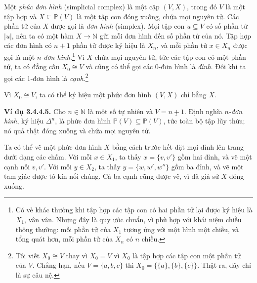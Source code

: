 Một \emph{phức đơn hình} (simplicial complex) là một cặp $(V,X)$, trong đó $V$ là một tập hợp và $X\subseteq\mathbb P(V)$ là một tập con đóng xuống, chứa mọi nguyên tử. Các phần tử của $X$ được gọi là \emph{đơn hình} (simplex). Mọi tập con $u\subseteq V$ có số phần tử $|u|$, nên ta có một hàm $X\to\mathbb N$ gửi mỗi đơn hình đến số phần tử của nó. Tập hợp các đơn hình có $n+1$ phần tử được ký hiệu là $X_n$, và mỗi phần tử $x\in X_n$ được gọi là một \emph{$n$-đơn hình}.\footnote{Có vẻ khác thường khi tập hợp các tập con có hai phần tử lại được ký hiệu là $X_1$, vân vân. Nhưng đây là quy ước chuẩn, vì phù hợp với khái niệm chiều thông thường: mỗi phần tử của $X_1$ tương ứng với một hình một chiều, và tổng quát hơn, mỗi phần tử của $X_n$ có $n$ chiều.} Vì $X$ chứa mọi nguyên tử, tức các tập con có một phần tử, ta có đẳng cấu $X_0\cong V$ và cũng có thể gọi các 0-đơn hình là \emph{đỉnh}. Đôi khi ta gọi các 1-đơn hình là \emph{cạnh}.\footnote{Tôi viết $X_0\cong V$ thay vì $X_0=V$ vì $X_0$ là tập hợp các tập con một phần tử của $V$. Chẳng hạn, nếu $V=\{a,b,c\}$ thì $X_0=\{\{a\},\{b\},\{c\}\}$. Thật ra, đây chỉ là sự câu nệ.}

Vì $X_0\cong V$, ta có thể ký hiệu một phức đơn hình $(V,X)$ chỉ bằng $X$.

\noindent\textbf{Ví dụ 3.4.4.5.} Cho $n\in\mathbb N$ là một số tự nhiên và $V=\underline{n+1}$. Định nghĩa \emph{$n$-đơn hình}, ký hiệu $\Delta^n$, là phức đơn hình $\mathbb P(V)\subseteq\mathbb P(V)$, tức toàn bộ tập lũy thừa; nó quả thật đóng xuống và chứa mọi nguyên tử.

Ta có thể vẽ một phức đơn hình $X$ bằng cách trước hết đặt mọi đỉnh lên trang dưới dạng các chấm. Với mỗi $x\in X_1$, ta thấy $x=\{v,v'\}$ gồm hai đỉnh, và vẽ một cạnh nối $v,v'$. Với mỗi $y\in X_2$, ta thấy $y=\{w,w',w''\}$ gồm ba đỉnh, và vẽ một tam giác được tô kín nối chúng. Cả ba cạnh cũng được vẽ, vì đã giả sử $X$ đóng xuống.

